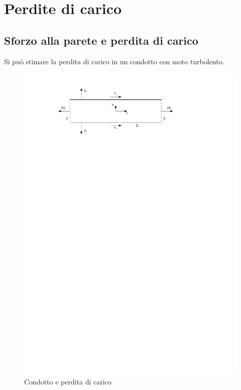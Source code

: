 %
\section{Perdite di carico} 
\subsection{Sforzo alla parete e perdita di carico}
Si può stimare la perdita di carico in un condotto con moto turbolento.
	\begin{figure}[ht]
		\includegraphics[scale=0.7]{./8.4 Perdite di carico/8.4-1}
		\centering
		\caption{Condotto e perdita di carico}
	\end{figure}
